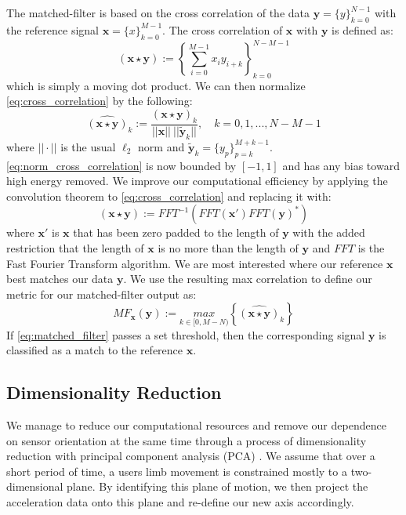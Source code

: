 \documentclass[journal]{IEEEtran}
\begin{document}
The matched-filter is based on the cross correlation of the data $\textbf{y} = \{y\}_{k=0}^{N-1}$ with the reference signal $\textbf{x} = \{x\}_{k=0}^{M-1}$.
The cross correlation of $\textbf{x}$ with $\textbf{y}$ is defined as:
%
\begin{equation} \label{eq:cross_correlation}
(\textbf{x} \star \textbf{y}) := \left \{\sum_{i=0}^{M-1}x_{i} y_{i+k} \right \}_{k=0}^{N-M-1}
\end{equation}
%
which is simply a moving dot product.
We can then normalize \eqref{eq:cross_correlation} by the following:
%
\begin{equation} \label{eq:norm_cross_correlation}
\widehat{(\textbf{x} \star \textbf{y})}_k := \frac{(\textbf{x} \star \textbf{y})_k}{||\textbf{x}|| \ || \widetilde{\textbf{y}}_k || }, \quad k = 0,1,...,N-M-1
\end{equation}
%
where $|| \cdot ||$ is the usual $\ell_2$ norm and $\widetilde{\textbf{y}}_k = \{y_p\}_{p=k}^{M+k-1}$.
\eqref{eq:norm_cross_correlation} is now bounded by $[-1,1]$ and has any bias toward high energy removed.
We improve our computational efficiency by applying the convolution theorem to \eqref{eq:cross_correlation} and replacing it with:
%
\begin{equation} \label{eq:conv_theorem}
(\textbf{x} \star \textbf{y}) := FFT^{-1}(FFT(\textbf{x}') FFT(\textbf{y})^*)
\end{equation}
%
where $\textbf{x}'$ is $\textbf{x}$ that has been zero padded to the length of $\textbf{y}$ with the added restriction that the length of $\textbf{x}$ is no more than the length of $\textbf{y}$ and $FFT$ is the Fast Fourier Transform algorithm.
We are most interested where our reference $\textbf{x}$ best matches our data $\textbf{y}$.
We use the resulting max correlation to define our metric for  our matched-filter output as:
%
\begin{equation} \label{eq:matched_filter}
MF_{\textbf{x}}(\textbf{y}) := \underset{k \in [0, M-N)}{max} \left \{\widehat{(\textbf{x} \star \textbf{y})}_k \right \}
\end{equation}
%
If \eqref{eq:matched_filter} passes a set threshold, then the corresponding signal $\textbf{y}$ is classified as a match to the reference $\textbf{x}$.
%
\subsection{Dimensionality Reduction}
We manage to reduce our computational resources and remove our dependence on sensor orientation at the same time through a process of dimensionality reduction with principal component analysis (PCA) \cite{bishop_2006}.
We assume that over a short period of time, a user\textquotesingle s limb movement is constrained mostly to a two-dimensional plane.
By identifying this plane of motion, we then project the acceleration data onto this plane and re-define our new axis accordingly.
\end{document}
